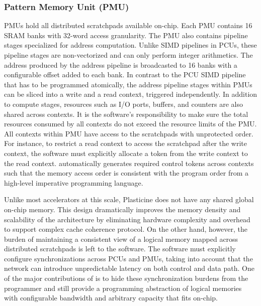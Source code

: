 \subsubsection{Pattern Memory Unit (PMU)}
PMUs hold all distributed scratchpads available on-chip. 
Each PMU contains 16 SRAM banks with
32-word access granularity. The PMU also contains pipeline stages specialized for address
computation. Unlike SIMD pipelines in PCUs, these pipeline stages are non-vectorized and can only perform integer arithmetics. 
The address produced by the address pipeline is broadcasted to 16 banks with a configurable offset added to each bank.
In contrast to the PCU SIMD pipeline that has to be programmed atomically, the address pipeline stages within PMUs can be sliced into a write and a read context, triggered independently.
In addition to compute stages, resources such as I/O ports, buffers, and counters are also shared across contexts.
It is the software's responsibility to make sure the total resources consumed by all
contexts do not exceed the resource limits of the PMU.
All contexts within PMU have access to the scratchpads with unprotected order. For instance, to
restrict a read context to access the scratchpad after the write context, the software must explicitly allocate
a token from the write context to the read context.
\name automatically generates required control tokens across contexts such that the memory access order is
consistent with the program order from a high-level imperative programming language.

Unlike most accelerators at this scale, Plasticine does not have any shared global on-chip memory. 
This design dramatically improves the memory density and scalability of the architecture 
by eliminating hardware complexity and overhead to support complex cache coherence protocol.
On the other hand, however, the burden of maintaining a consistent view of a logical memory mapped
across distributed scratchpads is left to the software.
The software must explicitly configure synchronizations across PCUs and PMUs, taking into account
that the network can introduce unpredictable latency on both control and data path.
One of the major contributions of \name is to hide these synchronization burdens from the programmer and still provide a programming abstraction of logical memories with configurable bandwidth and arbitrary capacity that fits on-chip.

